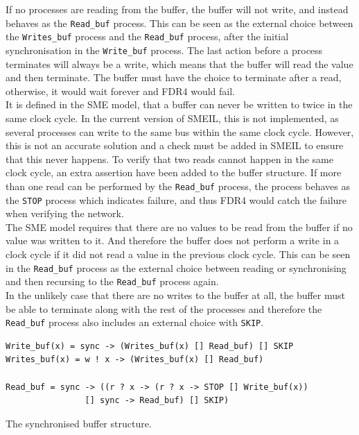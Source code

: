If no processes are reading from the buffer, the buffer will not write, and instead behaves as the \texttt{Read\_buf} process. This can be seen as the external choice between the \texttt{Writes\_buf} process and the \texttt{Read\_buf} process, after the initial synchronisation in the \texttt{Write\_buf} process.
The last action before a process terminates will always be a write, which means that the buffer will read the value and then terminate. The buffer must have the choice to terminate after a read, otherwise, it would wait forever and FDR4 would fail. \\

It is defined in the SME model, that a buffer can never be written to twice in the same clock cycle. In the current version of SMEIL, this is not implemented, as several processes can write to the same bus within the same clock cycle. However, this is not an accurate solution and a check must be added in SMEIL to ensure that this never happens. To verify that two reads cannot happen in the same clock cycle, an extra assertion have been added to the buffer structure.
If more than one read can be performed by the \texttt{Read\_buf} process, the process behaves as the \texttt{STOP} process which indicates failure, and thus FDR4 would catch the failure when verifying the network.\\

The SME model requires that there are no values to be read from the buffer if no value was written to it. And therefore the buffer does not perform a write in a clock cycle if it did not read a value in the previous clock cycle. This can be seen in the \texttt{Read\_buf} process as the external choice between reading or synchronising and then recursing to the \texttt{Read\_buf} process again.\\

In the unlikely case that there are no writes to the buffer at all, the buffer must be able to terminate along with the rest of the processes and therefore the \texttt{Read\_buf} process also includes an external choice with \texttt{SKIP}.

\begin{listing}
\begin{verbatim}
Write_buf(x) = sync -> (Writes_buf(x) [] Read_buf) [] SKIP
Writes_buf(x) = w ! x -> (Writes_buf(x) [] Read_buf)

Read_buf = sync -> ((r ? x -> (r ? x -> STOP [] Write_buf(x))
                [] sync -> Read_buf) [] SKIP)
\end{verbatim}
\caption{The synchronised buffer structure.}
\label{lst:buffer}
\end{listing}

